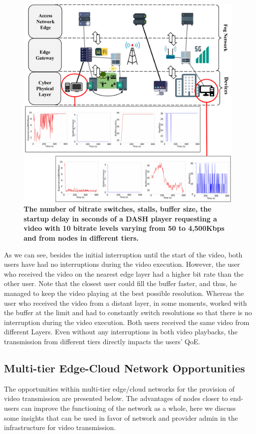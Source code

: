 \begin{figure}
    \centering
    \includegraphics[width=0.65\linewidth]{images/qoe-multi-level.pdf}
    \caption{\textbf{The number of bitrate switches, stalls, buffer size, the startup delay in seconds of a DASH player requesting a video with 10 bitrate levels varying from 50 to 4,500Kbps and from nodes in different tiers.}}
    \label{fig:impact-two-layers}
\end{figure}


As we can see, besides the initial interruption until the start of the video, both users have had no interruptions during the video execution. However, the user who received the video on the nearest edge layer had a higher bit rate than the other user. 
Note that the closest user could fill the buffer faster, and thus, he managed to keep the video playing at the best possible resolution.
Whereas the user who received the video from a distant layer, in some moments, worked with the buffer at the limit and had to constantly switch resolutions so that there is no interruption during the video execution. 
Both users received the same video from different Layers. Even without any interruptions in both video playbacks, the transmission from different tiers directly impacts the users' QoE.


\subsection{Multi-tier Edge-Cloud Network Opportunities}

The opportunities within multi-tier edge/cloud networks for the provision of video transmission are presented below. The advantages of nodes closer to end-users can improve the functioning of the network as a whole, here we discuss some insights that can be used in favor of network and provider admin in the infrastructure for video transmission.

